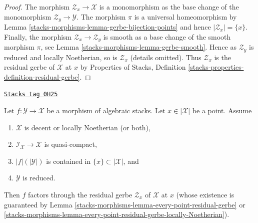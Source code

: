 \begin{proof}
The morphism $\mathcal{Z}_x \to \mathcal{X}$ is a monomorphism as
the base change of the monomorphism $\mathcal{Z}_y \to \mathcal{Y}$.
The morphism $\pi$ is a universal homeomorphism by
Lemma \ref{stacks-morphisms-lemma-gerbe-bijection-points} and hence $|\mathcal{Z}_x| = \{x\}$.
Finally, the morphism $\mathcal{Z}_x \to \mathcal{Z}_y$ is smooth
as a base change of the smooth morphism $\pi$, see
Lemma \ref{stacks-morphisms-lemma-gerbe-smooth}.
Hence as $\mathcal{Z}_y$ is reduced and locally Noetherian, so
is $\mathcal{Z}_x$ (details omitted). Thus $\mathcal{Z}_x$ is
the residual gerbe of $\mathcal{X}$ at $x$ by
Properties of Stacks, Definition
\ref{stacks-properties-definition-residual-gerbe}.
\end{proof}

\begin{lemma}
\label{stacks-morphisms-lemma-factor-through-residual-space}
\href{https://stacks.math.columbia.edu/tag/0H25}{\texttt{Stacks tag 0H25}}

Let $f : \mathcal{Y} \to \mathcal{X}$ be a morphism of algebraic stacks.
Let $x \in |\mathcal{X}|$ be a point. Assume
\begin{enumerate}
\item $\mathcal{X}$ is decent or locally Noetherian (or both),
\item $\mathcal{I}_\mathcal{X} \to \mathcal{X}$ is quasi-compact,
\item $|f|(|\mathcal{Y}|)$ is contained in $\{x\} \subset |\mathcal{X}|$, and
\item $\mathcal{Y}$ is reduced.
\end{enumerate}
Then $f$ factors through the residual gerbe $\mathcal{Z}_x$
of $\mathcal{X}$ at $x$ (whose existence is guaranteed by
Lemma \ref{stacks-morphisms-lemma-every-point-residual-gerbe} or
\ref{stacks-morphisms-lemma-every-point-residual-gerbe-locally-Noetherian}).
\end{lemma}

